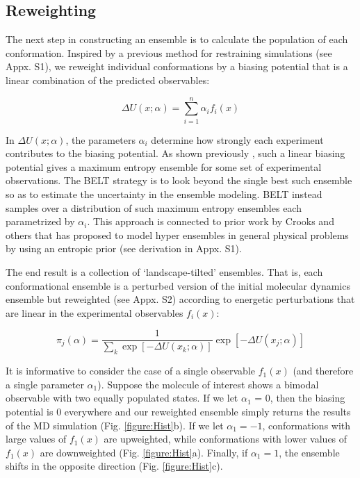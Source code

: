\documentclass[11pt,titlepage]{article}
\begin{document}
\subsection*{Reweighting}

The next step in constructing an ensemble is to calculate the population of each conformation.  Inspired by a previous method for restraining simulations  \citep{chodera2012} (see Appx. S1), we reweight individual conformations by a biasing potential that is a linear combination of the predicted observables:

$$\Delta U(x;\alpha) = \sum_{i=1}^n \alpha_i f_i(x)$$

In $\Delta U(x;\alpha)$, the parameters $\alpha_i$ determine how strongly each experiment contributes to the biasing potential.  As shown previously \citep{chodera2012}, such a linear biasing potential gives a maximum entropy ensemble for some set of experimental observations. The BELT strategy is to look beyond the single best such ensemble so as to estimate the uncertainty in the ensemble modeling. BELT instead samples over a distribution of such maximum entropy ensembles each parametrized by $\alpha_i$. This approach is connected to prior work by Crooks and others that has proposed to model hyper ensembles in general physical problems by using an entropic prior (see derivation in Appx. S1). 

The end result is a collection of `landscape-tilted' ensembles. That is, each conformational ensemble is a perturbed version of the initial molecular dynamics ensemble but reweighted (see Appx. S2) according to energetic perturbations that are linear in the experimental observables $f_i(x)$:

$$\pi_j(\alpha) = \frac{1}{\sum_k \exp[-\Delta U(x_k;\alpha)]} \exp[-\Delta U(x_j;\alpha)]$$

It is informative to consider the case of a single observable $f_1(x)$ (and therefore a single parameter $\alpha_1$).  Suppose the molecule of interest shows a bimodal observable with two equally populated states.  If we let $\alpha_1$ = 0, then the biasing potential is $0$ everywhere and our reweighted ensemble simply returns the results of the MD simulation (Fig. \ref{figure:Hist}b).  If we let $\alpha_1 = -1$, conformations with large values of $f_1(x)$ are upweighted, while conformations with lower values of $f_1(x)$ are downweighted (Fig. \ref{figure:Hist}a).  Finally, if $\alpha_1 = 1$, the ensemble shifts in the opposite direction (Fig. \ref{figure:Hist}c).  
\end{document}
